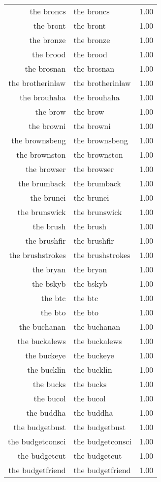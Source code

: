 \begin{table}[ht]
\begin{tabular}{rlr}
  the broncs & the broncs & 1.00 \\ 
  the bront & the bront & 1.00 \\ 
  the bronze & the bronze & 1.00 \\ 
  the brood & the brood & 1.00 \\ 
  the brosnan & the brosnan & 1.00 \\ 
  the brotherinlaw & the brotherinlaw & 1.00 \\ 
  the brouhaha & the brouhaha & 1.00 \\ 
  the brow & the brow & 1.00 \\ 
  the browni & the browni & 1.00 \\ 
  the brownsbeng & the brownsbeng & 1.00 \\ 
  the brownston & the brownston & 1.00 \\ 
  the browser & the browser & 1.00 \\ 
  the brumback & the brumback & 1.00 \\ 
  the brunei & the brunei & 1.00 \\ 
  the brunswick & the brunswick & 1.00 \\ 
  the brush & the brush & 1.00 \\ 
  the brushfir & the brushfir & 1.00 \\ 
  the brushstrokes & the brushstrokes & 1.00 \\ 
  the bryan & the bryan & 1.00 \\ 
  the bskyb & the bskyb & 1.00 \\ 
  the btc & the btc & 1.00 \\ 
  the bto & the bto & 1.00 \\ 
  the buchanan & the buchanan & 1.00 \\ 
  the buckalews & the buckalews & 1.00 \\ 
  the buckeye & the buckeye & 1.00 \\ 
  the bucklin & the bucklin & 1.00 \\ 
  the bucks & the bucks & 1.00 \\ 
  the bucol & the bucol & 1.00 \\ 
  the buddha & the buddha & 1.00 \\ 
  the budgetbust & the budgetbust & 1.00 \\ 
  the budgetconsci & the budgetconsci & 1.00 \\ 
  the budgetcut & the budgetcut & 1.00 \\ 
  the budgetfriend & the budgetfriend & 1.00 \\ 

\end{tabular}
\end{table}

